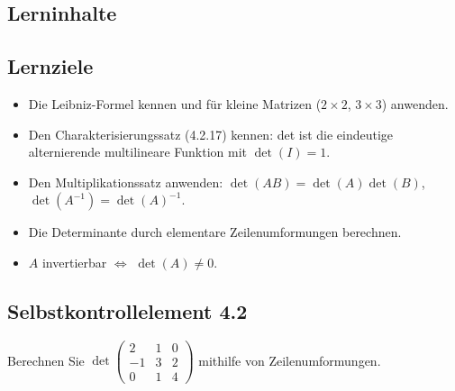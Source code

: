 \documentclass[a4paper,12pt]{article}
\begin{document}
\subsection*{Lerninhalte}
\begin{center}
\end{center}

\subsection*{Lernziele}
\begin{itemize}
  \item Die Leibniz-Formel kennen und für kleine Matrizen ($2{\times}2$, $3{\times}3$) anwenden.
  \item Den Charakterisierungssatz (4.2.17) kennen: det ist die eindeutige alternierende multilineare Funktion mit $\det(I) = 1$.
  \item Den Multiplikationssatz anwenden: $\det(AB) = \det(A)\det(B)$, $\det(A^{-1}) = \det(A)^{-1}$.
  \item Die Determinante durch elementare Zeilenumformungen berechnen.
  \item $A$ invertierbar $\iff$ $\det(A) \neq 0$.
\end{itemize}

\subsection*{Selbstkontrollelement 4.2}
Berechnen Sie $\det\begin{pmatrix}2&1&0\\-1&3&2\\0&1&4\end{pmatrix}$ mithilfe von Zeilenumformungen.
\end{document}
